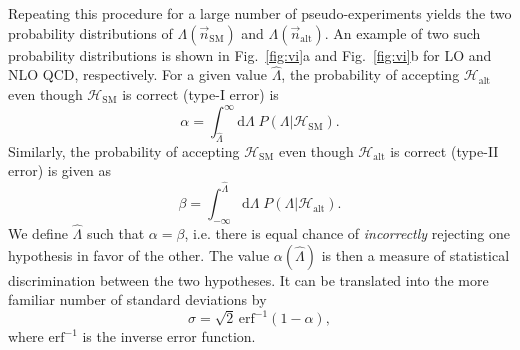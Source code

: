 \documentclass[preprint]{JHEP3} %
\newcommand{\SM}{\mathrm{SM}}
\newcommand{\alt}{\mathrm{alt}}
\def\hLambda {\hat{\Lambda}}
\def\erf{\mathrm{erf}}
\def\HSM{\mathcal{H}_{\mathrm{SM}}}
\def\Halt{\mathcal{H}_{\mathrm{alt}}}
\newcommand{\be}{\begin{eqnarray}}
\newcommand{\ee}{\end{eqnarray}}
\begin{document}


Repeating this procedure for a large number of pseudo-experiments yields the two probability distributions of $\Lambda(\vec{n}_\mathrm{SM})$ and $\Lambda(\vec{n}_\mathrm{alt})$. 
An example of two such probability distributions is shown in Fig.~\ref{fig:vi}a and Fig.~\ref{fig:vi}b for LO and NLO QCD, respectively. 
For a given value $\hat{\Lambda}$, the probability of accepting $\mathcal{H}_{\alt}$ even though $\mathcal{H}_{\SM}$ is correct (type-I error) is
\begin{equation}
    \alpha = \int_{\hLambda}^{\infty} \mathrm{d}\Lambda \; P(\Lambda | {\HSM}).
\end{equation}
Similarly, the probability of accepting $\mathcal{H}_{\SM}$ even though $\mathcal{H}_{\alt}$ is correct (type-II error) is given as 
\begin{equation}
    \beta = \int^{\hLambda}_{-\infty} \mathrm{d}\Lambda \; P(\Lambda|\Halt).
\end{equation}
We define $\hLambda$ such that $\alpha=\beta$, i.e. there is equal chance of {\it incorrectly} rejecting one hypothesis in favor of the other. 
The value $\alpha(\hLambda)$ is then a measure of statistical discrimination between the two hypotheses. 
It can be translated into the more familiar number of standard deviations by 
\begin{equation}
\sigma = \sqrt{2} \, \erf^{-1}(1-\alpha),
\end{equation}
where $\erf^{-1}$ is the inverse error function. 
\end{document}
